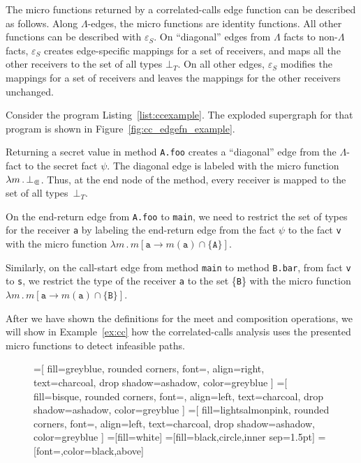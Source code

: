 The micro functions returned by a correlated-calls edge function can be described as follows. Along $\Lambda$-edges, the micro functions are identity functions. All other functions can be described with $\varepsilon_S$. On ``diagonal'' edges from $\Lambda$ facts to non-$\Lambda$ facts, $\varepsilon_S$ creates edge-specific mappings for a set of receivers, and maps all the other receivers to the set of all types $\bot_T$. On all other edges, $\varepsilon_S$ modifies the mappings for a set of receivers and leaves the mappings for the other receivers unchanged.

\begin{example}
  Consider the program Listing~\ref{list:ccexample}. The exploded supergraph for that program is shown in Figure~\ref{fig:cc_edgefn_example}.

  Returning a secret value in method \verb'A.foo' creates a ``diagonal'' edge from the $\Lambda$-fact to the secret fact $\psi$. 
  The diagonal edge is labeled with the micro function $\lambda m\,.\,\bot_\Subset$. Thus, at the end node of the method, every receiver is mapped to the set of all types~$\bot_T$.
  
On the end-return edge from \verb'A.foo' to \verb'main', we need to restrict the set of types for the receiver \verb'a' by labeling the end-return edge from the fact $\psi$ to the fact \verb'v' with the micro function $\lambda m\,.\,m[\texttt a\to m(\texttt a)\cap\{\texttt A\}]$.

Similarly, on the call-start edge from method \verb'main' to method \verb'B.bar', from fact \verb'v' to \verb's', we restrict the type of the receiver \verb'a' to the set \{\texttt B\} with the micro function~$\lambda m\,.\,m[\texttt a\to m(\texttt a)\cap\{\texttt B\}]$.

After we have shown the definitions for the meet and composition operations, we will show in Example~\ref{ex:cc} how the correlated-calls analysis uses the presented micro functions to detect infeasible paths.
  
\begin{figure}%
  \centering
    =[
      fill=greyblue,
      rounded corners,
      font=\footnotesize,
      align=right,
      text=charcoal,
      drop shadow={ashadow, color=greyblue}
    ]
    =[
      fill=bisque,
      rounded corners,
      font=\footnotesize,
      align=left,
      text=charcoal,
      drop shadow={ashadow, color=greyblue}
    ]
    =[
      fill=lightsalmonpink,
      rounded corners,
      font=\footnotesize,
      align=left,
      text=charcoal,
      drop shadow={ashadow, color=greyblue}
    ]
    =[fill=white]
    =[fill=black,circle,inner sep=1.5pt]
    =[font=\tiny,color=black,above]
    

\end{figure}
\end{example}
